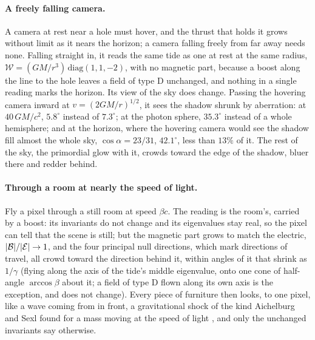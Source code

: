 \paragraph{A freely falling camera.} A camera at rest near a hole must hover, and the
thrust that holds it grows without limit as it nears the horizon; a camera
falling freely from far away needs none. Falling straight in, it reads the same tide as one at rest
at the same radius, $\mathcal W = (GM/r^3)\,\mathrm{diag}(1,1,-2)$, with no
magnetic part, because a boost along the line to the hole leaves a field of
type D unchanged, and nothing in a single reading marks the horizon. Its view of the sky does
change. Passing the hovering camera inward at $v = (2GM/r)^{1/2}$, it sees the
shadow shrunk by aberration: at $40\,GM/c^2$, $5.8^\circ$ instead of
$7.3^\circ$; at the photon sphere, $35.3^\circ$ instead of a whole hemisphere;
and at the horizon, where the hovering camera would see the shadow fill almost
the whole sky, $\cos\alpha = 23/31$, $42.1^\circ$, less than $13\%$ of it. The
rest of the sky, the primordial glow with it, crowds toward the edge of the
shadow, bluer there and redder behind.

\paragraph{Through a room at nearly the speed of light.} Fly a pixel through a
still room at speed $\beta c$. The reading is the room's, carried by a boost:
its invariants do not change and its eigenvalues stay real, so the pixel
can tell that the scene is still; but the magnetic part grows to match the electric,
$|\mathcal{B}|/|\mathcal{E}| \to 1$, and the four principal null directions, which mark
directions of travel, all
crowd toward the direction behind it, within angles of it that shrink as $1/\gamma$
(flying along the axis of the tide's middle eigenvalue, onto one cone of
half-angle $\arccos\beta$ about it; a field of type D flown along its own axis
is the exception, and does not change). Every piece of furniture then looks, to
one pixel, like a wave coming from in front, a gravitational shock of the kind
Aichelburg and Sexl found for a mass moving at the speed of light
\cite{AichelburgSexl1971}, and only the unchanged invariants say otherwise.

